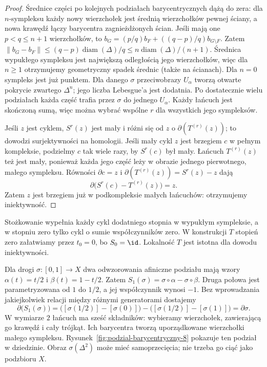 \begin{proof}
Średnice części po kolejnych podziałach
barycentrycznych dążą do zera: dla
$n$-sympleksu każdy nowy wierzchołek
jest średnią wierzchołków pewnej ściany,
a nowa krawędź łączy barycentra zagnieżdżonych ścian.
Jeśli mają one $p<q\leq n+1$ wierzchołków, to
$b_G=(p/q)b_F+((q-p)/q)b_{G\setminus F}$.
Zatem $\|b_G-b_F\|\leq(q-p)\operatorname{diam}(\Delta)/q
\leq n\operatorname{diam}(\Delta)/(n+1)$.
Średnica wypukłego sympleksu jest największą odległością jego
wierzchołków, więc dla $n\geq1$ otrzymujemy geometryczny spadek
średnic (także na ścianach). Dla $n=0$ sympleks jest już punktem. Dla danego $\sigma$
przeciwobrazy $U_\alpha$ tworzą
otwarte pokrycie zwartego $\Delta^n$;
jego liczba Lebesgue'a jest dodatnia.
Po dostatecznie wielu podziałach
każda część trafia przez $\sigma$
do jednego $U_\alpha$.
Każdy łańcuch jest skończoną sumą,
więc można wybrać wspólne $r$
dla wszystkich jego sympleksów.

Jeśli $z$ jest cyklem, $S^r(z)$
jest mały i różni się od $z$
o $\partial(T^{(r)}(z))$; to dowodzi
surjektywności na homologii.
Jeśli mały cykl $z$ jest brzegiem
$c$ w pełnym kompleksie, podzielmy
$c$ tak wiele razy, by $S^r(c)$
był mały. Łańcuch $T^{(r)}(z)$
też jest mały, ponieważ każda
jego część leży w obrazie
jednego pierwotnego, małego sympleksu.
Równości $\partial c=z$ i
$\partial(T^{(r)}(z))=S^r(z)-z$ dają
\[
 \partial\bigl(S^r(c)-T^{(r)}(z)\bigr)=z.
\]
Zatem $z$ jest brzegiem już
w podkompleksie małych łańcuchów:
otrzymujemy iniektywność.
\end{proof}

Stożkowanie wypełnia każdy cykl dodatniego stopnia w wypukłym
sympleksie, a w stopniu zero tylko cykl o sumie współczynników zero.
W konstrukcji $T$ stopień zero załatwiamy przez $t_0=0$,
bo $S_0=\id$. Lokalność $T$ jest istotna dla dowodu iniektywności.

\begin{przyklad}
\label{prz:podzial-singularny-8}
Dla drogi $\sigma:[0,1]\to X$ dwa odwzorowania afiniczne podziału
mają wzory $\alpha(t)=t/2$ i $\beta(t)=1-t/2$.
Zatem $S_1(\sigma)=\sigma\circ\alpha-\sigma\circ\beta$.
Druga połowa jest parametryzowana od $1$ do $1/2$, a jej
współczynnik wynosi $-1$. Bez wprowadzania jakiejkolwiek
relacji między różnymi generatorami dostajemy
\[
 \partial\bigl(S_1(\sigma)\bigr)
 =\bigl([\sigma(1/2)]-[\sigma(0)]\bigr)
  -\bigl([\sigma(1/2)]-[\sigma(1)]\bigr)
 =\partial\sigma.
\]
W wymiarze $2$ łańcuch ma sześć składników: wybieramy wierzchołek,
zawierającą go krawędź i cały trójkąt. Ich barycentra tworzą
uporządkowane wierzchołki małego sympleksu.
Rysunek~\ref{fig:podzial-barycentryczny-8} pokazuje ten podział
w dziedzinie. Obraz $\sigma(\Delta^2)$ może mieć samoprzecięcia;
nie trzeba go ciąć jako podzbioru $X$.
\end{przyklad}


